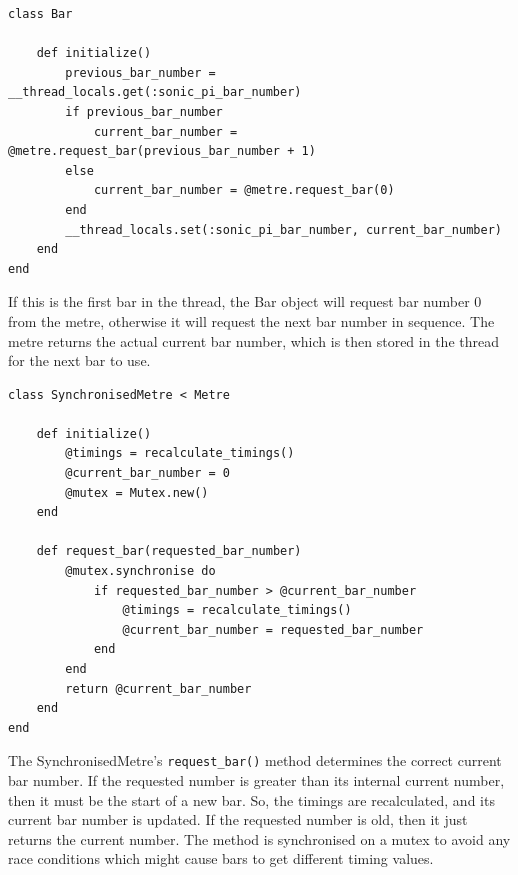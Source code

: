 \documentclass[12pt,twoside,openright]{report}
\begin{document}
\begin{verbatim}
class Bar

    def initialize()
        previous_bar_number = __thread_locals.get(:sonic_pi_bar_number)
        if previous_bar_number
            current_bar_number = @metre.request_bar(previous_bar_number + 1)
        else
            current_bar_number = @metre.request_bar(0)
        end
        __thread_locals.set(:sonic_pi_bar_number, current_bar_number)
    end
end
\end{verbatim}

If this is the first bar in the thread, the Bar object will request bar number 0
from the metre, otherwise it will request the next bar number in sequence. The
metre returns the actual current bar number, which is then stored in the thread
for the next bar to use.

\begin{verbatim}
class SynchronisedMetre < Metre

    def initialize()
        @timings = recalculate_timings()
        @current_bar_number = 0
        @mutex = Mutex.new()
    end

    def request_bar(requested_bar_number)
        @mutex.synchronise do
            if requested_bar_number > @current_bar_number
                @timings = recalculate_timings()
                @current_bar_number = requested_bar_number
            end
        end
        return @current_bar_number
    end
end
\end{verbatim}

The SynchronisedMetre's \verb'request_bar()' method determines the correct current bar
number. If the requested number is greater than its internal current number,
then it must be the start of a new bar. So, the timings are recalculated, and
its current bar number is updated. If the requested number is old, then it just
returns the current number. The method is synchronised on a mutex to avoid any
race conditions which might cause bars to get different timing values.
\end{document}
